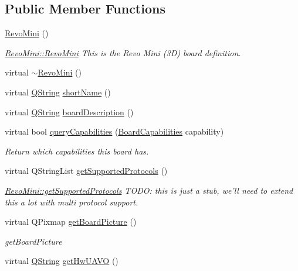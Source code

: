 \subsection*{Public Member Functions}
\begin{DoxyCompactItemize}
\item 
\hyperlink{group___boards___open_pilot_plugin_ga95d3e848c16c6f33a7d1acc14b2773da}{Revo\-Mini} ()
\begin{DoxyCompactList}\small\item\em \hyperlink{group___boards___open_pilot_plugin_ga95d3e848c16c6f33a7d1acc14b2773da}{Revo\-Mini\-::\-Revo\-Mini} This is the Revo Mini (3\-D) board definition. \end{DoxyCompactList}\item 
virtual \hyperlink{group___boards___open_pilot_plugin_ga6e4458ca98fbe0ed1501b324c934af47}{$\sim$\-Revo\-Mini} ()
\item 
virtual \hyperlink{group___u_a_v_objects_plugin_gab9d252f49c333c94a72f97ce3105a32d}{Q\-String} \hyperlink{group___boards___open_pilot_plugin_ga927253b30c15894799a8f99f632aec03}{short\-Name} ()
\item 
virtual \hyperlink{group___u_a_v_objects_plugin_gab9d252f49c333c94a72f97ce3105a32d}{Q\-String} \hyperlink{group___boards___open_pilot_plugin_ga721fb37ca43a4eaa930682025c96b24d}{board\-Description} ()
\item 
virtual bool \hyperlink{group___boards___open_pilot_plugin_ga5bf154e46cfe882c67dd2e851b4195c7}{query\-Capabilities} (\hyperlink{group___core_plugin_ga01b09218f2a13aaeee6db007ac6bd967}{Board\-Capabilities} capability)
\begin{DoxyCompactList}\small\item\em Return which capabilities this board has. \end{DoxyCompactList}\item 
virtual Q\-String\-List \hyperlink{group___boards___open_pilot_plugin_gaf820a526d814e3f0d11e403bc2c89f60}{get\-Supported\-Protocols} ()
\begin{DoxyCompactList}\small\item\em \hyperlink{group___boards___open_pilot_plugin_gaf820a526d814e3f0d11e403bc2c89f60}{Revo\-Mini\-::get\-Supported\-Protocols} T\-O\-D\-O\-: this is just a stub, we'll need to extend this a lot with multi protocol support. \end{DoxyCompactList}\item 
virtual Q\-Pixmap \hyperlink{group___boards___open_pilot_plugin_ga63ad5a29a4010dcb3e00f6e0383e741f}{get\-Board\-Picture} ()
\begin{DoxyCompactList}\small\item\em get\-Board\-Picture \end{DoxyCompactList}\item 
virtual \hyperlink{group___u_a_v_objects_plugin_gab9d252f49c333c94a72f97ce3105a32d}{Q\-String} \hyperlink{group___boards___open_pilot_plugin_gae959e2f2bea464d785957b6198a8c9c9}{get\-Hw\-U\-A\-V\-O} ()
\end{DoxyCompactItemize}
